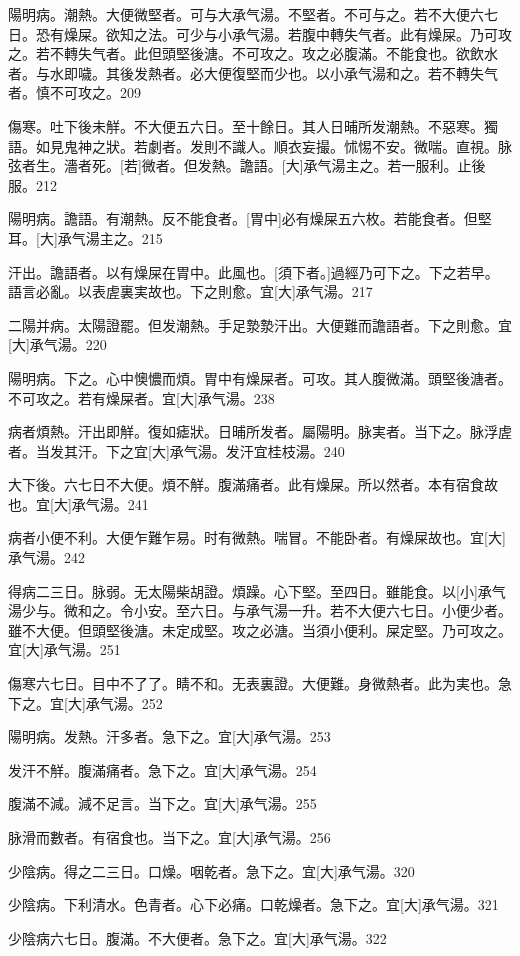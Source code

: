 \documentclass[12pt,twoside,UTF8,b5paper]{ctexbook}
\begin{document}
陽明病。潮熱。大便微堅者。可与大承气湯。不堅者。不可与之。若不大便六七日。恐有燥屎。欲知之法。可少与小承气湯。若腹中轉失气者。此有燥屎。乃可攻之。若不轉失气者。此但頭堅後溏。不可攻之。攻之必腹滿。不能食也。欲飲水者。与水即噦。其後发熱者。必大便復堅而少也。以小承气湯和之。若不轉失气者。慎不可攻之。209

傷寒。吐下後未觧。不大便五六日。至十餘日。其人日晡所发潮熱。不惡寒。獨語。如見鬼神之狀。若劇者。发則不識人。順衣妄撮。怵惕不安。微喘。直視。脉弦者生。濇者死。[若]微者。但发熱。譫語。[大]承气湯主之。若一服利。止後服。212

陽明病。譫語。有潮熱。反不能食者。[胃中]必有燥屎五六枚。若能食者。但堅耳。[大]承气湯主之。215

汗出。譫語者。以有燥屎在胃中。此風也。[須下者。]過經乃可下之。下之若早。語言必亂。以表虗裏実故也。下之則愈。宜[大]承气湯。217

二陽并病。太陽證罷。但发潮熱。手足漐漐汗出。大便難而譫語者。下之則愈。宜[大]承气湯。220

陽明病。下之。心中懊憹而煩。胃中有燥屎者。可攻。其人腹微滿。頭堅後溏者。不可攻之。若有燥屎者。宜[大]承气湯。238

病者煩熱。汗出即觧。復如瘧狀。日晡所发者。屬陽明。脉実者。当下之。脉浮虗者。当发其汗。下之宜[大]承气湯。发汗宜桂枝湯。240

大下後。六七日不大便。煩不觧。腹滿痛者。此有燥屎。所以然者。本有宿食故也。宜[大]承气湯。241

病者小便不利。大便乍難乍易。时有微熱。喘冒。不能卧者。有燥屎故也。宜[大]承气湯。242

得病二三日。脉弱。无太陽柴胡證。煩躁。心下堅。至四日。雖能食。以[小]承气湯少与。微和之。令小安。至六日。与承气湯一升。若不大便六七日。小便少者。雖不大便。但頭堅後溏。未定成堅。攻之必溏。当須小便利。屎定堅。乃可攻之。宜[大]承气湯。251

傷寒六七日。目中不了了。睛不和。无表裏證。大便難。身微熱者。此为実也。急下之。宜[大]承气湯。252

陽明病。发熱。汗多者。急下之。宜[大]承气湯。253

发汗不觧。腹滿痛者。急下之。宜[大]承气湯。254

腹滿不減。減不足言。当下之。宜[大]承气湯。255

脉滑而數者。有宿食也。当下之。宜[大]承气湯。256

少陰病。得之二三日。口燥。咽乾者。急下之。宜[大]承气湯。320

少陰病。下利清水。色青者。心下必痛。口乾燥者。急下之。宜[大]承气湯。321

少陰病六七日。腹滿。不大便者。急下之。宜[大]承气湯。322
\end{document}
